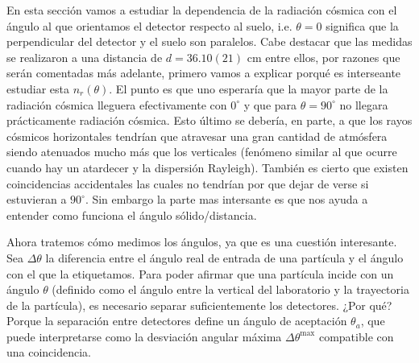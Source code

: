 \documentclass[11pt]{article}
\begin{document}
En esta sección vamos a estudiar la dependencia de la radiación cósmica con el ángulo al que orientamos el detector respecto al suelo, i.e. $\theta=0$ significa que la perpendicular del detector y el suelo son paralelos. Cabe destacar que las medidas se realizaron a una distancia de $d=36.10(21)$ cm entre ellos, por razones que serán comentadas más adelante, primero vamos a explicar porqué es interseante estudiar esta $n_r(\theta)$. El punto es que uno esperaría que la mayor parte de la radiación cósmica lleguera efectivamente con $0^\circ$ y que para $\theta=90^\circ$ no llegara prácticamente radiación cósmica. Esto último se debería, en parte, a que los rayos cósmicos horizontales tendrían que atravesar una gran cantidad de atmósfera siendo atenuados mucho más que los verticales (fenómeno similar al que ocurre cuando hay un atardecer y la dispersión Rayleigh). También es cierto que existen coincidencias accidentales las cuales no tendrían por que dejar de verse si estuvieran a $90^\circ$. Sin embargo la parte mas intersante es que nos ayuda a entender como funciona el ángulo sólido/distancia. 


Ahora tratemos cómo medimos los ángulos, ya que es una cuestión interesante. Sea $\Delta \theta$ la diferencia entre el ángulo real de entrada de una partícula y el ángulo con el que la etiquetamos. Para poder afirmar que una partícula incide con un ángulo $\theta$ (definido como el ángulo entre la vertical del laboratorio y la trayectoria de la partícula), es necesario separar suficientemente los detectores. ¿Por qué? Porque la separación entre detectores define un ángulo de aceptación $\theta_a$, que puede interpretarse como la desviación angular máxima $\Delta \theta^{\max}$ compatible con una coincidencia.
\end{document}
